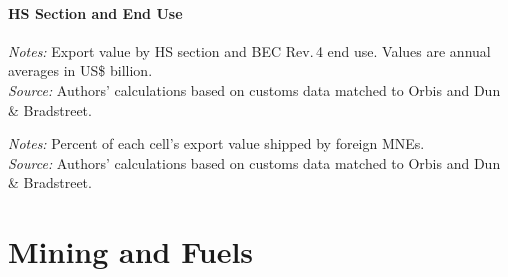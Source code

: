 \documentclass[11pt,a4paper]{article}
\begin{document}
\subsection{HS Section and End Use}
\begin{table}[H]\centering\small%
  \caption{Manufacturing: Exports by HS Section and End Use}%
  \label{tab:sxe_v_manufacturing}%
  \par\vspace{3pt}%
  \begin{minipage}{0.95\textwidth}\footnotesize %
  \textit{Notes:} Export value by HS section and BEC Rev.\,4 end use. Values are annual averages in US\$ billion.\\[3pt]%
  \textit{Source:} Authors' calculations based on customs data matched to Orbis and Dun \& Bradstreet.%
  \end{minipage}%
  \end{table}
\begin{table}[H]\centering\small%
  \caption{Manufacturing: Foreign-Multinational Share of Exports by HS Section and End Use}%
  \label{tab:sxe_f_manufacturing}%
  \par\vspace{3pt}%
  \begin{minipage}{0.95\textwidth}\footnotesize %
  \textit{Notes:} Percent of each cell's export value shipped by foreign MNEs.\\[3pt]%
  \textit{Source:} Authors' calculations based on customs data matched to Orbis and Dun \& Bradstreet.%
  \end{minipage}%
  \end{table}
\clearpage\part{Mining and Fuels}
\end{document}
